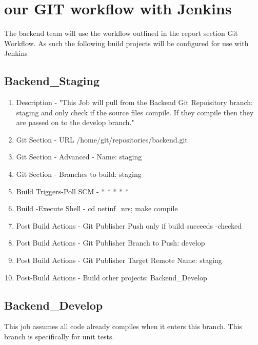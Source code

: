 \section {our GIT workflow with Jenkins}

The backend team will use the workflow outlined in the report section Git Workflow. As such the following build projects will be configured for use with Jenkins

\subsection{Backend\_Staging}
\begin{enumerate}
\item Description - "This Job will pull from the Backend Git Repoisitory branch: staging and only check if the source files compile. If they compile then they are passed on to the develop branch."
\item Git Section - URL /home/git/repositories/backend.git
\item Git Section - Advanced - Name: staging
\item Git Section - Branches to build: staging
\item Build Triggers-Poll SCM - * * * * *
\item Build -Execute Shell - cd netinf\_nrs; make compile
\item Post Build Actions - Git Publisher Push only if build succeeds -checked
\item Post Build Actions - Git Publisher Branch to Push: develop
\item Post Build Actions - Git Publisher Target Remote Name: staging
\item Post-Build Actions - Build other projects:  Backend\_Develop
\end{enumerate}
\subsection{Backend\_Develop}

This job assumes all code already compiles when it enters this branch. This branch is specifically for unit tests.

